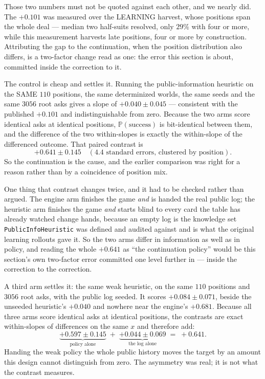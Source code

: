 \documentclass[11pt,letterpaper]{article}
\newcommand{\Prob}{\ensuremath{\mathbb{P}}}
\begin{document}
Those two numbers must not be quoted against each other, and we nearly did. The
$+0.101$ was measured over the LEARNING harvest, whose positions span the whole
deal --- median two half-suits resolved, only $29\%$ with four or more, while
this measurement harvests late positions, four or more by construction.
Attributing the gap to the continuation, when the position distribution also
differs, is a two-factor change read as one: the error this section is about,
committed inside the correction to it.

The control is cheap and settles it. Running the public-information heuristic on
the SAME $110$ positions, the same determinized worlds, the same seeds and the
same $3056$ root asks gives a slope of $\mathbf{+0.040 \pm 0.045}$ --- consistent
with the published $+0.101$ and indistinguishable from zero. Because the two arms
score identical asks at identical positions, $\Prob(\text{success})$ is
bit-identical between them, and the difference of the two within-slopes is
exactly the within-slope of the differenced outcome. That paired contrast is
\[
  +0.641 \pm 0.145 \quad (4.4\text{ standard errors, clustered by position}).
\]
So the continuation is the cause, and the earlier comparison was right for a
reason rather than by a coincidence of position mix.

One thing that contrast changes twice, and it had to be checked rather than
argued. The engine arm finishes the game \emph{and} is handed the real public
log; the heuristic arm finishes the game \emph{and} starts blind to every card
the table has already watched change hands, because an empty log is the
knowledge set \texttt{PublicInfoHeuristic} was defined and audited against and
is what the original learning rollouts gave it. So the two arms differ in
information as well as in policy, and reading the whole $+0.641$ as ``the
continuation policy'' would be this section's own two-factor error committed one
level further in --- inside the correction to the correction.

A third arm settles it: the same weak heuristic, on the same $110$ positions and
$3056$ root asks, with the public log seeded. It scores
$\mathbf{+0.084 \pm 0.071}$, beside the unseeded heuristic's $+0.040$ and
nowhere near the engine's $+0.681$. Because all three arms score identical asks
at identical positions, the contrasts are exact within-slopes of differences on
the same $x$ and therefore add:
\[
  \underbrace{+0.597 \pm 0.145}_{\text{policy alone}}
  \;+\;
  \underbrace{+0.044 \pm 0.069}_{\text{the log alone}}
  \;=\; +0.641 .
\]
Handing the weak policy the whole public history moves the target by an amount
this design cannot distinguish from zero. The asymmetry was real; it is not what
the contrast measures.
\end{document}
